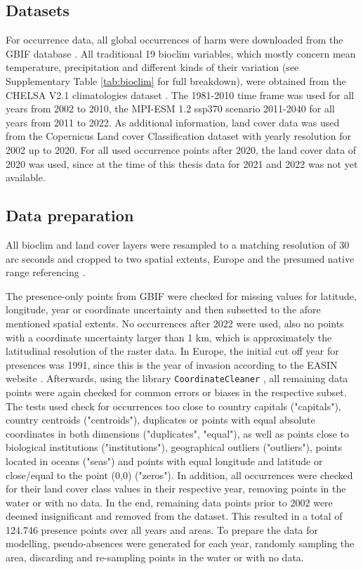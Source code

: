 \documentclass[12pt,a4paper]{article}
\begin{document}
\subsection{Datasets} \label{ssec:datasets}
For occurrence data, all global occurrences of \gls{harm} were downloaded from the GBIF database \autocite{GBIFaxyridisdataset}.
All traditional 19 bioclim variables, which mostly concern mean temperature, precipitation and different kinds of their variation (see Supplementary Table \ref{tab:bioclim} for full breakdown), were obtained from the CHELSA V2.1 climatologies dataset \autocite{karger2017CHELSApaper, CHELSAbioclimdataset}.
The 1981-2010 time frame was used for all years from 2002 to 2010, the MPI-ESM 1.2 ssp370 scenario 2011-2040 for all years from 2011 to 2022.
As additional information, land cover data was used from the Copernicus Land cover Classification dataset \autocite{COPlandcoverdataset}  with yearly resolution for 2002 up to 2020.
For all used occurrence points after 2020, the land cover data of 2020 was used, since at the time of this thesis data for 2021 and 2022 was not yet available.

\subsection{Data preparation} \label{ssec:datapreparation}
All bioclim and land cover layers were resampled to a matching resolution of 30 arc seconds and cropped to two spatial extents, Europe and the presumed native range referencing \autocite{orlova2015harmonia}.

The presence-only points from GBIF were checked for missing values for latitude, longitude, year or coordinate uncertainty and then subsetted to the afore mentioned spatial extents.
No occurrences after 2022 were used, also no points with a coordinate uncertainty larger than 1 km, which is approximately the latitudinal resolution of the raster data.
In Europe, the initial cut off year for presences was 1991, since this is the year of invasion according to the EASIN website \autocite{EASINintroharm}.
Afterwards, using the library \texttt{CoordinateCleaner} \autocite{zizka2019coordinatecleaner}, all remaining data points were again checked for common errors or biases in the respective subset.
The tests used check for occurrences too close to country capitals ("capitals"), country centroids ("centroids"), duplicates or points with equal absolute coordinates in both dimensions ("duplicates", "equal"), as well as points close to biological institutions ("institutions"), geographical outliers ("outliers"), points located in oceans ("seas") and points with equal longitude and latitude or close/equal to the point (0,0) ("zeros").
In addition, all occurrences were checked for their land cover class values in their respective year, removing points in the water or with no data.
In the end, remaining data points prior to 2002 were deemed insignificant and removed from the dataset.
This resulted in a total of 124.746 presence points over all years and areas.
To prepare the data for modelling, pseudo-absences were generated for each year, randomly sampling the area, discarding and re-sampling points in the water or with no data.
\end{document}
